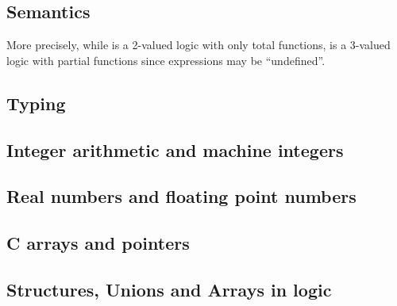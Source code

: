 
\subsection{Semantics}
\label{sec:twovaluedlogic}


More precisely, while \acsl is a 2-valued logic with only total functions,
\eacsl is a 3-valued logic with partial functions since expressions may be
``undefined''.



\subsection{Typing}

\nodiff


\subsection{Integer arithmetic and machine integers}

\nodiff


\subsection{Real numbers and floating point numbers}

\nodiff


\subsection{C arrays and pointers}

\nodiff


\subsection{Structures, Unions and Arrays in logic}

